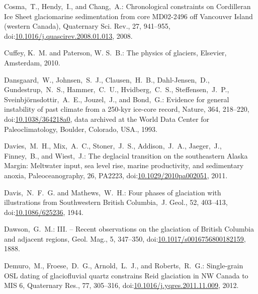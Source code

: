 \documentclass[tc, manuscript]{copernicus}
\begin{document}
\begin{thebibliography}{114}
Cosma,~T., Hendy,~I., and Chang,~A.: Chronological constraints on Cordilleran Ice Sheet glaciomarine sedimentation from core MD02-2496 off Vancouver Island (western Canada), Quaternary Sci. Rev., 27, 941--955,
doi:\href{http://dx.doi.org/10.1016/j.quascirev.2008.01.013}{10.1016/j.quascirev.2008.01.013}, 2008.


Cuffey, K.~M. and Paterson, W. S.~B.: The physics of glaciers, Elsevier, Amsterdam, 2010.


Dansgaard,~W., Johnsen,~S.~J., Clausen,~H.~B., Dahl-Jensen,~D., Gundestrup,~N.~S., Hammer,~C.~U., Hvidberg,~C.~S., Steffensen,~J.~P., Sveinbj\"ornsdottir,~A.~E., Jouzel,~J., and Bond,~G.: Evidence for general instability of past climate from a 250-kyr ice-core record, Nature, 364, 218--220,
doi:\href{http://dx.doi.org/10.1038/364218a0}{10.1038/364218a0}, data archived at the World Data Center for Paleoclimatology, Boulder, Colorado, USA., 1993.


Davies,~M.~H., Mix,~A.~C., Stoner,~J.~S., Addison,~J.~A., Jaeger,~J., Finney,~B., and Wiest,~J.: The deglacial transition on the southeastern Alaska Margin: Meltwater input, sea level rise, marine productivity, and sedimentary anoxia, Paleoceanography, 26, PA2223,
doi:\href{http://dx.doi.org/10.1029/2010pa002051}{10.1029/2010pa002051}, 2011.


Davis,~N.~F.~G. and Mathews,~W.~H.: Four phases of glaciation with illustrations from Southwestern British Columbia,~J. Geol., 52, 403--413,
doi:\href{http://dx.doi.org/10.1086/625236}{10.1086/625236}, 1944.


Dawson,~G.~M.: III. -- Recent observations on the glaciation of British Columbia and adjacent regions, Geol. Mag., 5, 347--350,
doi:\href{http://dx.doi.org/10.1017/s0016756800182159}{10.1017/s0016756800182159}, 1888.


Demuro,~M., Froese,~D.~G., Arnold,~L.~J., and Roberts,~R.~G.: Single-grain OSL dating of glaciofluvial quartz constrains Reid glaciation in NW Canada to MIS 6, Quaternary Res., 77, 305--316,
doi:\href{http://dx.doi.org/10.1016/j.yqres.2011.11.009}{10.1016/j.yqres.2011.11.009}, 2012.



\end{thebibliography}
\end{document}
